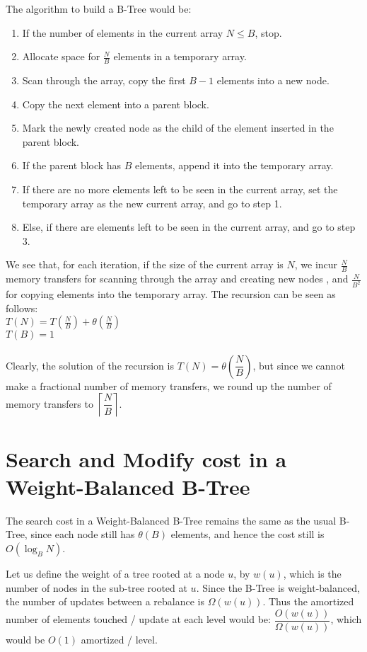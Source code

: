 \documentclass{article}
\begin{document}
The algorithm to build a B-Tree would be:
\begin{enumerate}
\item If the number of elements in the current array $N \leq B $, stop.
\item Allocate space for $\frac{N}{B}$ elements in a temporary array.
\item Scan through the array, copy the first $B-1$ elements into a new node.
\item Copy the next element into a parent block. 
\item Mark the newly created node as the child of the element inserted in the parent block.
\item If the parent block has $B$ elements, append it into the temporary array.
\item If there are no more elements left to be seen in the current array, set the temporary
array as the new current array, and go to step 1.
\item Else, if there are elements left to be seen in the current array, and go to step 3.
\end{enumerate}

We see that, for each iteration, if the size of the current array is $N$, we incur
$\frac{N}{B}$ memory transfers for scanning through the array and creating new nodes
, and $\frac{N}{B^2}$ for copying elements into the temporary array. The recursion
can be seen as follows:\\

$T(N) = T(\frac{N}{B}) + \theta(\frac{N}{B})$ \\
$T(B) = 1$\\
\\
Clearly, the solution of the recursion is $T(N) = \theta\left(\dfrac{N}{B}\right)$, but since we cannot
make a fractional number of memory transfers, we round up the number of memory transfers
to $\left\lceil \dfrac{N}{B} \right\rceil$.

\clearpage

\clearpage

\section {Search and Modify cost in a Weight-Balanced B-Tree}
The search cost in a Weight-Balanced B-Tree remains the same as the usual
B-Tree, since each node still has $\theta(B)$ elements, and hence the cost still is
$O(\log_B{N})$.

Let us define the weight of a tree rooted at a node $u$, by $w(u)$, which is the
number of nodes in the sub-tree rooted at $u$. Since the B-Tree is weight-balanced,
the number of updates between a rebalance is $\Omega(w(u))$. Thus the 
amortized number of elements touched / update at each level would be: 
$\dfrac{O(w(u))}{\Omega(w(u))}$, which would be $O(1)$ amortized / level. 
\end{document}
